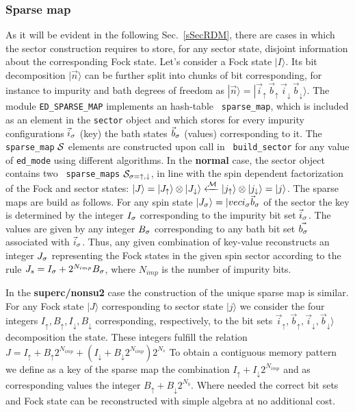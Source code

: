 \documentclass[preprint,3p,10pt]{elsarticle}
\newcommand{\secu}[1]
{Sec.~\ref{#1}}
\newcommand{\ket}[1]
{|#1\rangle}
\def\up{\uparrow} \def\down{\downarrow} \def\dw{\downarrow}
\begin{document}
\subsubsection{Sparse map}\label{CodeSparseMap}
As it will be evident in the following \secu{sSecRDM}, there are cases in
which the sector construction requires to store, for any sector state,
disjoint information about the corresponding Fock state.
Let's consider a Fock state $\ket{I}$. Its bit decomposition
$\ket{\vec{n}}$ can be further split into chunks of bit corresponding,
for instance to impurity and bath degrees of freedom as 
$\ket{\vec{n}}=\ket{\vec{i}_\up\,\vec{b}_\up\,\vec{i}_\dw\,\vec{b}_\dw}$.  
The module {\tt ED\_SPARSE\_MAP} implements an hash-table {\tt
  sparse\_map}, which is included as an element in the {\tt sector} object and  
which stores  for every impurity configurations $\vec{i}_\s$ (key) the
bath states $\vec{b}_\s$ (values) corresponding to it.
The {\tt sparse\_map} ${\cal S}$ elements are constructed upon call in {\tt
  build\_sector} for any value of {\tt ed\_mode} using different
algorithms.
In the {\bf normal} case, the sector object contains two {\tt
  sparse\_maps} ${\cal S}_{\s=\up,\dw}$, in line with the
spin dependent factorization of the Fock and sector states: 
$\ket{J}=\ket{J_\up}\otimes\ket{J_\dw} \xleftarrow{\MM}
\ket{j_\up}\otimes\ket{j_\dw}=\ket{j}$.
The sparse maps are build as follows. 
For any spin state $\ket{J_\s}=\ket{{vec{i}_{\s}\vec{b}_{\s}}$ of the sector
the key is determined by the integer $I_\s$ corresponding to the
impurity bit set $\vec{i}_\s$. The values are given by any 
integer $B_\s$ corresponding to any bath bit set
$\vec{b_\s}$ associated with $\vec{i}_\s$.
Thus, any given combination of key-value
reconstructs an integer $J_\s$ representing the Fock states in the
given spin sector according to the rule $J_s = I_\s +
2^{N_{imp}}B_\s$, where $N_{imp}$ is the number of impurity bits. 

In the {\bf superc/nonsu2} case the construction of the unique sparse
map is similar. For any Fock state $\ket{J}$ corresponding to sector
state $\ket{j}$ we consider the four integers $I_\up, B_\up, I_\dw,
B_\dw$ corresponding, respectively, to the bit sets
$\vec{i}_\up,\vec{b}_\up,\vec{i}_\dw,\vec{b}_\dw}$ decomposition the
state. These integers fulfill the relation
$
J =I_\up +  B_\up2^{N_{imp}} + (I_\dw +  B_\dw2^{N_{imp}})2^{N_s}
$
To obtain a contiguous memory pattern we define as a key of the sparse
map the combination $I_\up + I_\dw2^{N_{imp}}$ and as corresponding
  values the integer $B_\up + B_\dw2^{N_b}$. Where needed the correct
  bit sets and Fock state can be reconstructed with simple algebra at
  no additional cost.   
\end{document}
